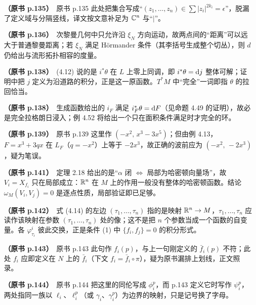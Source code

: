 \noindent \textbf{（原书 p.135）}\ 原书 p.135 此处把集合写成“$(z_1,\dots,z_n)\in\sum|z_i|^{2k_i}=\epsilon$”，脱漏了定义域与分隔竖线，译文按文意补足为 $\mathbb{C}^n$ 与“$|$”。\par\smallskip

\noindent \textbf{（原书 p.136）}\ 次黎曼几何中只允许沿 $\xi_N$ 方向运动，故两点间的“距离”可以远大于普通黎曼距离；若 $\xi_N$ 满足 Hörmander 条件（其李括号生成整个切丛），则 $d$ 仍给出与流形拓扑相容的度量。\par\smallskip

\noindent \textbf{（原书 p.138）}\ (4.12) 说的是 $i^*\theta$ 在 $L$ 上零上同调，即 $i^*\theta=\mathrm{d} j$ 整体可解；证明中把 $j$ 定义为沿道路的积分，正是这一原函数。$T^*M$ 中“完全”一词即指 $\theta$ 的拉回恰当。\par\smallskip

\noindent \textbf{（原书 p.138）}\ 生成函数给出的 $i_F$ 满足 $i_F^*\theta=\mathrm{d} F$（见命题 4.49 的证明），故必是完全拉格朗日浸入；例 4.52 将给出一个只在面积条件满足时才完全的环。\par\smallskip

\noindent \textbf{（原书 p.139）}\ 原书 p.139 这里作 $(-x^2,\,x^3-3x^5)$；但由例 4.13，$F=x^3+3qx$ 在 $L_F$（$q=-x^2$）上等于 $-2x^3$，故正确的波前应为 $(-x^2,\,-2x^3)$，疑为笔误。\par\smallskip

\noindent \textbf{（原书 p.141）}\ 定理 2.18 给出的是“$\alpha$ 闭 $\Leftrightarrow$ 局部为哈密顿向量场”，故 $V_i=X_{f_i}$ 只在局部成立：$\mathbb{R}^n$ 在 $M$ 上的作用一般没有整体的哈密顿函数。结论 $\omega_M(V_i,V_j)=0$ 是逐点性质，局部验证即已足够。\par\smallskip

\noindent \textbf{（原书 p.142）}\ 式 (4.14) 的左边 $(\tau_1,\dots,\tau_n)$ 指的是映射 $\mathbb{R}^n\to M$，$\tau_1,\dots,\tau_n$ 应读作该映射在参数 $(\tau_1,\dots,\tau_n)$ 处的像；这不是把 $n$ 个参数当成一个函数的自变量。各 $\varphi^i_{\tau_i}$ 彼此交换，正是条件 (1) 中 $\{f_i,f_j\}=0$ 的积分形式。\par\smallskip

\noindent \textbf{（原书 p.143）}\ 原书 p.143 此句作 $f_i(p)$，与上一句刚定义的 $\bar f_i(p)$ 不符；此处 $f_i$ 应即定义在 $N$ 上的 $\bar f_i$（下文 $f_i=\bar f_i\circ\pi$），疑为原书漏排上划线，正文照录。\par\smallskip

\noindent \textbf{（原书 p.144）}\ 原书 p.144 把这里的同伦写成 $\phi^p_i$，而 p.143 定义它时写作 $\psi^p_i$，两处指同一族以 $\ell_i$、$\ell^p_i$（或 $\gamma_i$、$\gamma^p_i$）为边界的映射，只是记号换了字母。\par\smallskip


